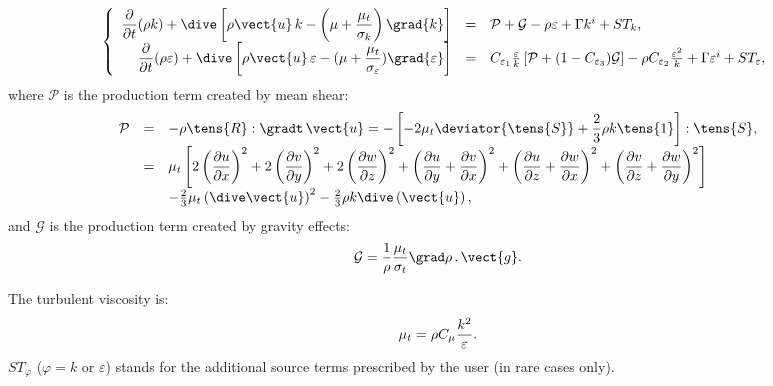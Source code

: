 \begin{equation}
\left\{
\begin{array}{r c l}
\displaystyle\frac{\partial }{\partial t}(\rho k)+\dive\left[ \rho \vect{u}%
\,k- \left( \mu +\frac{\mu _{t}}{\sigma _{k}} \right)\grad{k}\right] 
&=&
\mathcal{P}+\mathcal{G}-\rho \varepsilon +\Gamma k^{i}+ST_{k}, \\
\displaystyle\frac{\partial }{\partial t}(\rho \varepsilon )+\dive\left[
\rho \vect{u}\,\varepsilon -(\mu +\frac{\mu _{t}}{\sigma _{\varepsilon }})%
\grad{\varepsilon}\right] &=&C_{\varepsilon _{1}}\frac{\varepsilon }{k}\left[
\mathcal{P}+(1-C_{\varepsilon _{3}})\mathcal{G}\right] -\rho C_{\varepsilon
_{2}}\frac{\varepsilon ^{2}}{k}+\Gamma \varepsilon ^{i}+ST_{\varepsilon },%
\end{array}%
\right.
\end{equation}
where $\mathcal{P}$ is the production term created by mean shear:
%
\begin{equation}
\begin{array}{rcl}
\mathcal{P} & = & \displaystyle -\rho \tens{R} : \gradt \, \vect{u}
= -\left[-2 \mu_t \deviator{\tens{S}}%
+ \frac{2}{3}\rho k \tens{1}\right] : \tens{S}, \\
& = & \displaystyle \mu_t \left[ 2\left(\frac{\partial u}{\partial x}%
\right)^2+ 2\left(\frac{\partial v}{\partial y}\right)^2+ 2\left(\frac{%
\partial w}{\partial z}\right)^2+ \left(\frac{\partial u}{\partial y}+\frac{%
\partial v}{\partial x}\right)^2+ \left(\frac{\partial u}{\partial z}+\frac{%
\partial w}{\partial x}\right)^2+ \left(\frac{\partial v}{\partial z}+\frac{%
\partial w}{\partial y}\right)^2 \right] \\
&&-\frac{2}{3}\mu_t \left( \dive\vect{u} \right)^2-\frac{2}{3}
\rho k \dive \left( \vect{u} \right),
\end{array}
\end{equation}
and
$\mathcal{G}$ is the production term created by gravity effects: 
\begin{equation}
\displaystyle \mathcal{G}= \frac{1}{\rho}\frac{\mu_t}{\sigma_t} \grad \rho \, . \, \vect{g}.
\end{equation}

The turbulent viscosity is: 
\begin{equation}
\displaystyle \mu_t=\rho C_\mu\frac{k^2}{%
\varepsilon}.
\end{equation}
$ST_{\varphi }$ ($\varphi =k$ or $\varepsilon $) stands for the additional
source terms prescribed by the user (in rare cases only).

